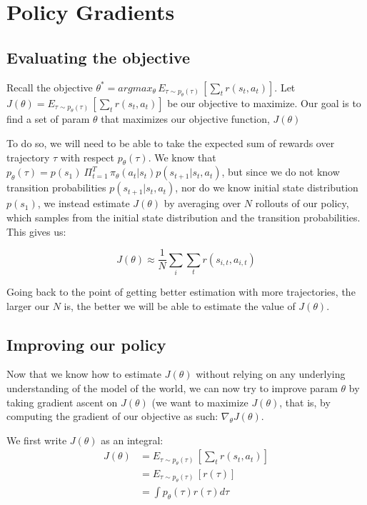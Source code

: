 \documentclass[11pt]{article} %
\begin{document}
\section{Policy Gradients}
\subsection{Evaluating the objective}
Recall the objective $\theta^* = argmax_\theta\, E_{\tau \sim p_\theta(\tau)}\,[\sum_t r(s_t, a_t)]$. Let $J(\theta) = E_{\tau \sim p_\theta(\tau)}\,[\sum_t r(s_t, a_t)]$ be our objective to maximize. Our goal is to find a set of param $\theta$ that maximizes our objective function, $J(\theta)$

To do so, we will need to be able to take the expected sum of rewards over trajectory $\tau$ with respect $p_\theta(\tau)$. We know that $p_\theta(\tau) = p(s_1)\: \Pi^T_{t=1}\,\pi_\theta(a_t|s_t)p(s_{t+1}|s_t, a_t)$, but since we do not know transition probabilities $p(s_{t+1}|s_t, a_t)$, nor do we know initial state distribution $p(s_1)$, we instead estimate $J(\theta)$ by averaging over $N$ rollouts of our policy, which samples from the initial state distribution and the transition probabilities. This gives us: 

\begin{equation}\label{eq:objective_funct}
    J(\theta) \approx \frac{1}{N}\sum_i\sum_t r(s_{i,t}, a_{i,t})
\end{equation}

Going back to the point of getting better estimation with more trajectories, the larger our $N$ is, the better we will be able to estimate the value of $J(\theta)$.

\subsection{Improving our policy}
Now that we know how to estimate $J(\theta)$ without relying on any underlying understanding of the model of the world, we can now try to improve param $\theta$ by taking gradient ascent on $J(\theta)$ (we want to maximize $J(\theta)$, that is, by computing the gradient of our objective as such: $\nabla_\theta J(\theta)$.

We first write $J(\theta)$ as an integral:
\begin{equation*}
\begin{split}
        J(\theta) &= E_{\tau \sim p_\theta(\tau)}\,[\sum_t r(s_t, a_t)] \\ &= E_{\tau \sim p_\theta(\tau)}\,[r(\tau)] \\
        &= \int p_\theta(\tau)r(\tau)d\tau
\end{split}
\end{equation*}
\end{document}
